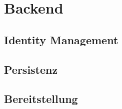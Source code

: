 \section{Backend}

\subsection{Identity Management}

\subsection{Persistenz}

\subsection{Bereitstellung}

  

 
 
 
 
 
 
 
 